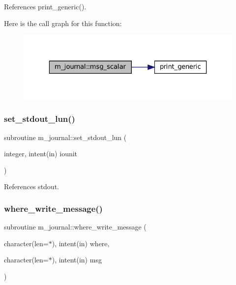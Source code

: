 References print\+\_\+generic().

Here is the call graph for this function\+:\nopagebreak
\begin{figure}[H]
\begin{center}
\leavevmode
\includegraphics[width=323pt]{namespacem__journal_a7906bba242b412d6941f4b32233b7eca_cgraph}
\end{center}
\end{figure}
\mbox{\label{namespacem__journal_a8388800481a5e7ca022b52cfc56b9daf}} 
\subsubsection{\texorpdfstring{set\+\_\+stdout\+\_\+lun()}{set\_stdout\_lun()}}
{\footnotesize\ttfamily subroutine m\+\_\+journal\+::set\+\_\+stdout\+\_\+lun (\begin{DoxyParamCaption}\item[{integer, intent(in)}]{iounit }\end{DoxyParamCaption})\hspace{0.3cm}{\ttfamily [private]}}



References stdout.

\mbox{\label{namespacem__journal_a21238c3fc7731703c75eb39233ab529e}} 
\subsubsection{\texorpdfstring{where\+\_\+write\+\_\+message()}{where\_write\_message()}}
{\footnotesize\ttfamily subroutine m\+\_\+journal\+::where\+\_\+write\+\_\+message (\begin{DoxyParamCaption}\item[{character(len=$\ast$), intent(in)}]{where,  }\item[{character(len=$\ast$), intent(in)}]{msg }\end{DoxyParamCaption})\hspace{0.3cm}{\ttfamily [private]}}



